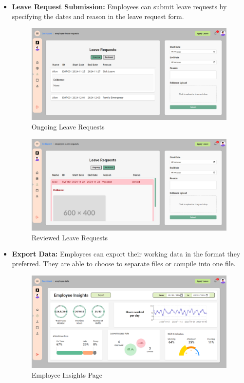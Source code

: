 \documentclass[a4paper,12pt, oneside]{report}
\begin{document}
\begin{itemize}
    \item \textbf{Leave Request Submission:} Employees can submit leave requests by specifying the dates and reason in the leave request form.
    \begin{figure}[H]
    \centering
    \includegraphics[width=0.8\columnwidth]{EmployeePages/LeaveRequest.png}
    \caption{Ongoing Leave Requests}
    \label{fig:employee-on-leave-request}
    \end{figure}

    \begin{figure}[H]
    \centering
    \includegraphics[width=0.8\columnwidth]{EmployeePages/LeaveRequest2.png}
    \caption{Reviewed Leave Requests}
    \label{fig:employee-rev-leave-request}
    \end{figure}
    
    \item \textbf{Export Data:} Employees can export their working data in the format they preferred. They are able to choose to separate files or compile into one file.
    
    \begin{figure}[H]
    \centering
    \includegraphics[width=0.8\columnwidth]{EmployeePages/ExportData3.png}
    \caption{Employee Insights Page}
    \label{fig:employee-insight-page}
    \end{figure}


\end{itemize}
\end{document}
